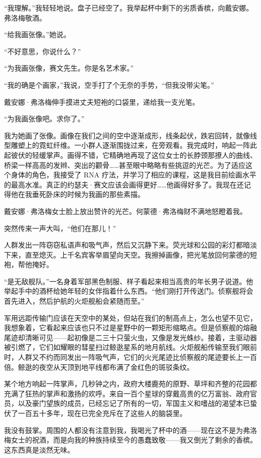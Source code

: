 \documentclass[AutoFakeBold=true]{book}
\begin{document}
``我理解。''我轻轻地说。盘子已经空了。我举起杯中剩下的劣质香槟，向戴安娜。 弗洛梅敬酒。

``给我画张像。''她说。

``不好意思，你说什么？''

``为我画张像，赛文先生。你是名艺术家。''

``我的确是个画家，''我说，空手打了个无奈的手势，``但我没带尖笔。''

戴安娜·弗洛梅伸手摸进丈夫短袍的口袋里，递给我一支光笔。

``为我画张像吧。求你了。''

我为她画了张像。画像在我们之间的空中逐渐成形，线条起伏，跌宕回转，就像线型雕塑上的霓虹纤维。一小群人逐渐围拢过来，在旁观看。我完成时，响起一阵此起彼伏的轻缓掌声。画得不错，它精确地再现了这位女士的长脖颈那撩人的曲线、桥梁一样高高的发辫、突出的颧骨……甚至眼中略略有些挑逗的光芒。为了适应这个身体的角色，我接受了 RNA 疗法，并学习了相应的课程，这是我目前绘画水平的最高水准。真正的约瑟夫·赛文应该会画得更好……他画得好多了。我现在还记得他在我垂死卧床的时候为我画的那些素描。

戴安娜·弗洛梅女士脸上放出赞许的光芒。何蒙德·弗洛梅财不满地怒瞪着我。

突然传来一声大叫，``他们在那儿！''

人群发出一阵窃窃私语声和吸气声，然后又沉静下来。荧光球和公园的彩灯都暗淡下来，直至熄灭。上千名宾客举眉望向天空。我擦掉画像，把光笔放回何蒙德的短袍，帮他掩好。

``是无敌舰队。''一名身着军部黑色制服、样子看起来相当高贵的年长男子说道。他举起手中的酒杯给她年轻的女伴指着什么东西。``他们刚打开传送门。侦察舰将会首先进入，然后护航的火炬舰船会紧随而至。''

军用远距传输门应该在天空中的某处，但站在我们的制高点上，怎么也望不见它，我想象着，它看起来应该也只不过是星野中的一颗矩形缩略点。但是侦察舰的熔融尾迹却清晰可见——起初像是二三十只萤火虫，又像是发光蛛纱。接着，主驱动器被引燃了，它们如耀眼的彗星扫过鲸逖星系的地月航线。火炬舰船传输至我们眼前时，人群又不约而同发出一阵吸气声，它们的火光尾迹比侦察舰的尾迹要长上一百倍。鲸逖的夜空从天顶到地平线都布满了金红色的斑驳条纹。

某个地方响起一阵掌声，几秒钟之内，政府大楼鹿苑的原野、草坪和齐整的花园都充满了狂热的掌声和激扬的欢呼。来自一百个星球的穿戴高贵的亿万富翁、政府官员，以及豪门望族的成员，已经忘记了所有的一切，军国主义和嗜战的渴望本已蛰伏了一百五十多年，现在已完全充斥在了这些人的脑袋里。

我没有鼓掌。周围的人都没有注意到我，我喝光了杯中的酒——现在这不是为弗洛梅女士的祝酒，而是向我的种族持续至今的愚蠢致敬——我又倒光了剩余的香槟。这东西真是淡然无味。
\end{document}

